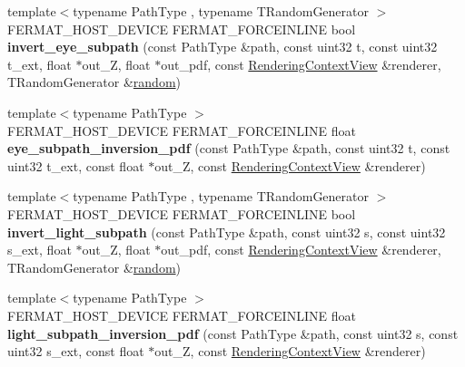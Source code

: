 \begin{DoxyCompactItemize}
\item 
\mbox{\label{group___path_module_ga7f9ae29454dded68cdef487b1d35fd9a}} 
{\footnotesize template$<$typename Path\+Type , typename T\+Random\+Generator $>$ }\\F\+E\+R\+M\+A\+T\+\_\+\+H\+O\+S\+T\+\_\+\+D\+E\+V\+I\+CE F\+E\+R\+M\+A\+T\+\_\+\+F\+O\+R\+C\+E\+I\+N\+L\+I\+NE bool {\bfseries invert\+\_\+eye\+\_\+subpath} (const Path\+Type \&path, const uint32 t, const uint32 t\+\_\+ext, float $\ast$out\+\_\+Z, float $\ast$out\+\_\+pdf, const \hyperlink{struct_rendering_context_view}{Rendering\+Context\+View} \&renderer, T\+Random\+Generator \&\hyperlink{group___sampling_module_gaec17bbbfd36295353081b7b4480d933d}{random})
\item 
\mbox{\label{group___path_module_ga97619b3314cb048b9af4aed8b5724d91}} 
{\footnotesize template$<$typename Path\+Type $>$ }\\F\+E\+R\+M\+A\+T\+\_\+\+H\+O\+S\+T\+\_\+\+D\+E\+V\+I\+CE F\+E\+R\+M\+A\+T\+\_\+\+F\+O\+R\+C\+E\+I\+N\+L\+I\+NE float {\bfseries eye\+\_\+subpath\+\_\+inversion\+\_\+pdf} (const Path\+Type \&path, const uint32 t, const uint32 t\+\_\+ext, const float $\ast$out\+\_\+Z, const \hyperlink{struct_rendering_context_view}{Rendering\+Context\+View} \&renderer)
\item 
\mbox{\label{group___path_module_gaa53acb9062a624ae464a52c2b09b0c6a}} 
{\footnotesize template$<$typename Path\+Type , typename T\+Random\+Generator $>$ }\\F\+E\+R\+M\+A\+T\+\_\+\+H\+O\+S\+T\+\_\+\+D\+E\+V\+I\+CE F\+E\+R\+M\+A\+T\+\_\+\+F\+O\+R\+C\+E\+I\+N\+L\+I\+NE bool {\bfseries invert\+\_\+light\+\_\+subpath} (const Path\+Type \&path, const uint32 s, const uint32 s\+\_\+ext, float $\ast$out\+\_\+Z, float $\ast$out\+\_\+pdf, const \hyperlink{struct_rendering_context_view}{Rendering\+Context\+View} \&renderer, T\+Random\+Generator \&\hyperlink{group___sampling_module_gaec17bbbfd36295353081b7b4480d933d}{random})
\item 
\mbox{\label{group___path_module_ga9aba8aeaa8a07139583975ca21c06fad}} 
{\footnotesize template$<$typename Path\+Type $>$ }\\F\+E\+R\+M\+A\+T\+\_\+\+H\+O\+S\+T\+\_\+\+D\+E\+V\+I\+CE F\+E\+R\+M\+A\+T\+\_\+\+F\+O\+R\+C\+E\+I\+N\+L\+I\+NE float {\bfseries light\+\_\+subpath\+\_\+inversion\+\_\+pdf} (const Path\+Type \&path, const uint32 s, const uint32 s\+\_\+ext, const float $\ast$out\+\_\+Z, const \hyperlink{struct_rendering_context_view}{Rendering\+Context\+View} \&renderer)

\end{DoxyCompactItemize}
